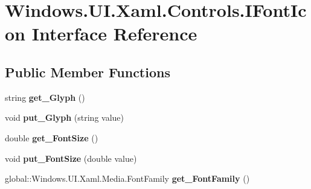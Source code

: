 \hypertarget{interface_windows_1_1_u_i_1_1_xaml_1_1_controls_1_1_i_font_icon}{}\section{Windows.\+U\+I.\+Xaml.\+Controls.\+I\+Font\+Icon Interface Reference}
\label{interface_windows_1_1_u_i_1_1_xaml_1_1_controls_1_1_i_font_icon}
\subsection*{Public Member Functions}
\begin{DoxyCompactItemize}
\item 
\mbox{\label{interface_windows_1_1_u_i_1_1_xaml_1_1_controls_1_1_i_font_icon_a7b89ee1452fbf6add71574383ec042ad}} 
string {\bfseries get\+\_\+\+Glyph} ()
\item 
\mbox{\label{interface_windows_1_1_u_i_1_1_xaml_1_1_controls_1_1_i_font_icon_a286f89cdc8e53df9aaa1bcae6107ea9f}} 
void {\bfseries put\+\_\+\+Glyph} (string value)
\item 
\mbox{\label{interface_windows_1_1_u_i_1_1_xaml_1_1_controls_1_1_i_font_icon_ab38ce1dfd80b0b587d2104020f6af58f}} 
double {\bfseries get\+\_\+\+Font\+Size} ()
\item 
\mbox{\label{interface_windows_1_1_u_i_1_1_xaml_1_1_controls_1_1_i_font_icon_ae3677531a4f648e82404282b2852bf18}} 
void {\bfseries put\+\_\+\+Font\+Size} (double value)
\item 
\mbox{\label{interface_windows_1_1_u_i_1_1_xaml_1_1_controls_1_1_i_font_icon_a9a70a7f083b2528d375f3a8262aae382}} 
global\+::\+Windows.\+U\+I.\+Xaml.\+Media.\+Font\+Family {\bfseries get\+\_\+\+Font\+Family} ()
\item 
\mbox{\label{interface_windows_1_1_u_i_1_1_xaml_1_1_controls_1_1_i_font_icon_ac80bf98a4d031b00224048236e74f7a1}} 

\end{DoxyCompactItemize}
